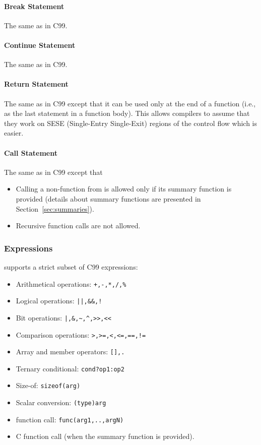 \paragraph{Break Statement}
The same as in C99.
\paragraph{Continue Statement}
The same as in C99.
\paragraph{Return Statement}
The same as in C99 except that it can be used only at the end of a function
(i.e., as the last statement in a function body).
This allows \pencil compilers to assume that they work on SESE
(Single-Entry Single-Exit) regions of the control flow which is easier.

\paragraph{Call Statement}
The same as in C99 except that
\begin{itemize}
 \item Calling a non-\pencil function from \pencil
   is allowed only if its summary function is provided
   (details about summary functions are presented in
    Section~\ref{sec:summaries}).
 \item Recursive function calls are not allowed.
\end{itemize}

\subsubsection{Expressions}
\pencil supports a strict subset of C99 expressions:
\begin{itemize}
  \item Arithmetical operations: \lstinline!+,-,*,/,%!
  \item Logical operations: \lstinline{||,&&,!}
  \item Bit operations: \lstinline{|,&,~,^,>>,<<}
  \item Comparison operations: \lstinline{>,>=,<,<=,==,!=}
  \item Array and member operators: \lstinline{[],.}
  \item Ternary conditional: \lstinline!cond?op1:op2!
  \item Size-of: \lstinline!sizeof(arg)!
  \item Scalar conversion: \lstinline!(type)arg!
  \item \pencil function call: \lstinline!func(arg1,..,argN)!
  \item C function call (when the summary function is provided).
\end{itemize}


